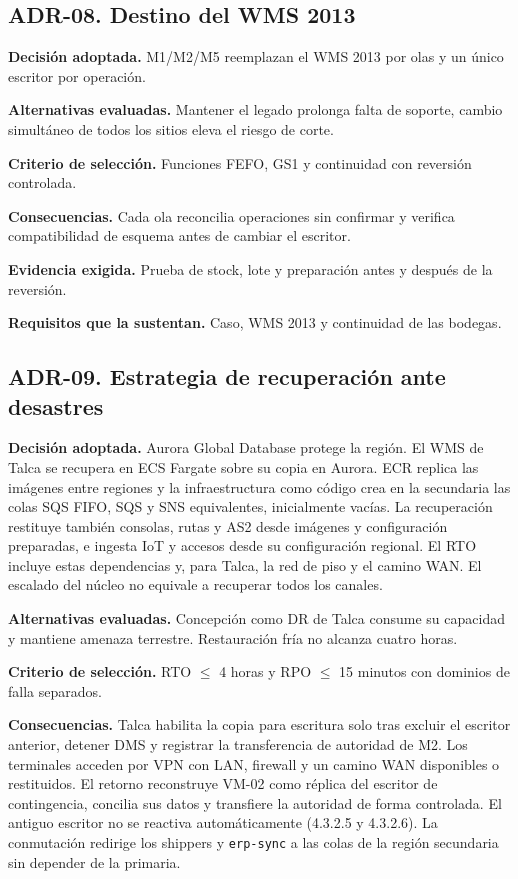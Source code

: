 \subsection*{ADR-08. Destino del WMS 2013}
\label{sub:adr-08}
\textbf{Decisión adoptada.} M1/M2/M5 reemplazan el WMS 2013 por olas y un único escritor por operación.

\textbf{Alternativas evaluadas.} Mantener el legado prolonga falta de soporte, cambio simultáneo de todos los sitios eleva el riesgo de corte.

\textbf{Criterio de selección.} Funciones FEFO, GS1 y continuidad con reversión controlada.

\textbf{Consecuencias.} Cada ola reconcilia operaciones sin confirmar y verifica compatibilidad de esquema antes de cambiar el escritor.

\textbf{Evidencia exigida.} Prueba de stock, lote y preparación antes y después de la reversión.

\textbf{Requisitos que la sustentan.} Caso, WMS 2013 y continuidad de las bodegas.

\subsection*{ADR-09. Estrategia de recuperación ante desastres}
\label{sub:adr-09}
\textbf{Decisión adoptada.} Aurora Global Database protege la región. El WMS de Talca se recupera en ECS Fargate sobre su copia en Aurora. ECR replica las imágenes entre regiones y la infraestructura como código crea en la secundaria las colas SQS FIFO, SQS y SNS equivalentes, inicialmente vacías. La recuperación restituye también consolas, rutas y AS2 desde imágenes y configuración preparadas, e ingesta IoT y accesos desde su configuración regional. El RTO incluye estas dependencias y, para Talca, la red de piso y el camino WAN. El escalado del núcleo no equivale a recuperar todos los canales.

\textbf{Alternativas evaluadas.} Concepción como DR de Talca consume su capacidad y mantiene amenaza terrestre. Restauración fría no alcanza cuatro horas.

\textbf{Criterio de selección.} RTO $\leq$ 4 horas y RPO $\leq$ 15 minutos con dominios de falla separados.

\textbf{Consecuencias.} Talca habilita la copia para escritura solo tras excluir el escritor anterior, detener DMS y registrar la transferencia de autoridad de M2. Los terminales acceden por VPN con LAN, firewall y un camino WAN disponibles o restituidos. El retorno reconstruye VM-02 como réplica del escritor de contingencia, concilia sus datos y transfiere la autoridad de forma controlada. El antiguo escritor no se reactiva automáticamente (4.3.2.5 y 4.3.2.6). La conmutación redirige los shippers y \texttt{erp-sync} a las colas de la región secundaria sin depender de la primaria.

